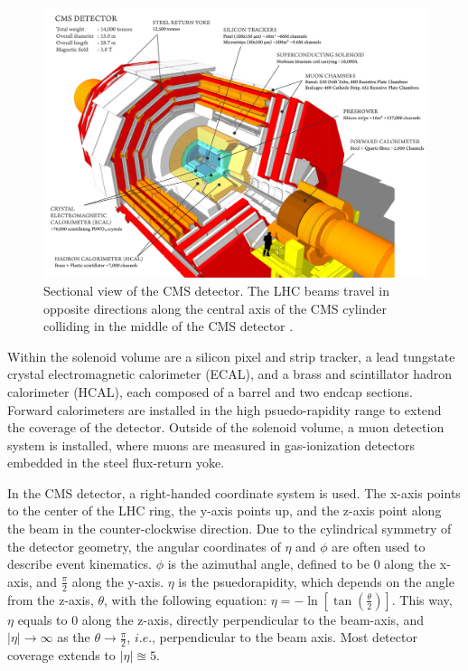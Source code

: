 \begin{figure}
    \begin{minipage}[t]{\linewidth}\centering
        \includegraphics[width=15cm]{cms_detector.png}
    \end{minipage}
    \caption{Sectional view of the CMS detector. The LHC beams travel in opposite directions 
    along the central axis of the CMS cylinder colliding in the middle of the CMS detector \cite{detector:cms_overall}.}
    \label{fig:cms_overall_diagram}
\end{figure}

Within the solenoid volume are a silicon pixel and strip tracker, a lead tungstate crystal electromagnetic calorimeter (ECAL), 
and a brass and scintillator hadron calorimeter (HCAL), each composed of a barrel and two endcap sections. Forward calorimeters
are installed in the high psuedo-rapidity range to extend the coverage of the detector. Outside of the solenoid volume,
a muon detection system is installed, where muons are measured in gas-ionization detectors embedded in the steel flux-return yoke.

In the CMS detector, a right-handed coordinate system is used. The x-axis points to the center of the LHC ring, the y-axis points up, 
and the z-axis point along the beam in the counter-clockwise direction. Due to the cylindrical symmetry of the detector geometry, the angular
coordinates of $\eta$ and $\phi$ are often used to describe event kinematics. $\phi$ is the azimuthal angle, defined to be 0 along the x-axis,
and $\frac{\pi}{2}$ along the y-axis. $\eta$ is the psuedorapidity, which depends on the angle from the z-axis, $\theta$, with the following
equation: $\eta = -\ln[{\tan({\frac{\theta}{2}})}]$. This way, $\eta$ equals to 0 along the z-axis, directly perpendicular to the beam-axis,
and $|\eta| \rightarrow \infty$ as the $\theta \rightarrow \frac{\pi}{2}$, $\textit{i.e.,}$ perpendicular to the beam axis. Most detector coverage
extends to $|\eta| \approxeq 5$. 

